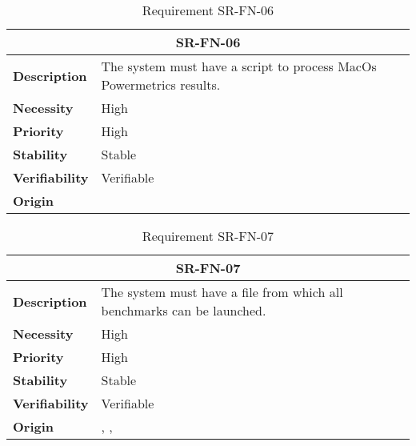 \begin{table}[H]
    \centering
    \begin{tabular}{l p{10cm}}
        \toprule
        \multicolumn{2}{c}{SR-FN-06} \\
        \toprule
        \textbf{Description}        &  The system must have a script to process MacOs Powermetrics results. \\
        \textbf{Necessity}          &  High \\
        \textbf{Priority}           &  High \\
        \textbf{Stability}          &  Stable \\
        \textbf{Verifiability}      & Verifiable \\
        \textbf{Origin}             & \textit{\nameref{tab:ur-ca-05}} \\
    \end{tabular}
    \caption{Requirement SR-FN-06}
    \label{tab:sr-fn-06}
\end{table}

\begin{table}[H]
    \centering
    \begin{tabular}{l p{10cm}}
        \toprule
        \multicolumn{2}{c}{SR-FN-07} \\
        \toprule
        \textbf{Description}        &  The system must have a file from which all benchmarks can be launched. \\
        \textbf{Necessity}          &  High \\
        \textbf{Priority}           &  High \\
        \textbf{Stability}          &  Stable \\
        \textbf{Verifiability}      & Verifiable \\
        \textbf{Origin}             & \textit{\nameref{tab:ur-ca-05}}, \textit{\nameref{tab:ur-ca-14}}, \textit{\nameref{tab:ur-ca-17}} \\
    \end{tabular}
    \caption{Requirement SR-FN-07}
    \label{tab:sr-fn-07}
\end{table}

